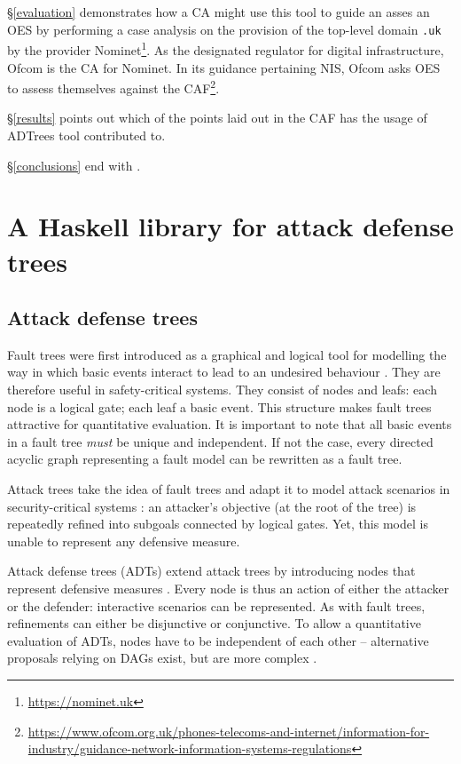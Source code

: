 \documentclass{scrreprt}
\begin{document}
\S\ref{evaluation} demonstrates how a CA might use this tool to guide an asses
an OES by performing a case analysis on the provision of the top-level domain
\texttt{.uk} by the provider Nominet\footnote{\url{https://nominet.uk}}. As the
designated regulator for digital infrastructure, Ofcom is the CA for Nominet. In
its guidance pertaining NIS, Ofcom asks OES to assess themselves against the
CAF\footnote{\url{https://www.ofcom.org.uk/phones-telecoms-and-internet/information-for-industry/guidance-network-information-systems-regulations}}.

\S\ref{results} points out which of the points laid out in the CAF has the usage
of ADTrees tool contributed to. \todo{}

\S\ref{conclusions} end with \todo{}.


\chapter{A Haskell library for attack defense trees}
\label{tool}

\section{Attack defense trees}

Fault trees were first introduced as a graphical and logical tool for modelling
the way in which basic events interact to lead to an undesired behaviour
\cite[IV.1]{Vesely1981}. They are therefore useful in safety-critical systems.
They consist of nodes and leafs: each node is a logical gate; each leaf a basic
event. This structure makes fault trees attractive for quantitative evaluation.
It is important to note that all basic events in a fault tree \textit{must} be
unique and independent. If not the case, every directed acyclic graph
representing a fault model can be rewritten as a fault tree.  

Attack trees take the idea of fault trees and adapt it to model attack scenarios
in security-critical systems \cite{Schneier1999} \cite{Brooke2003}
\cite{NaiFovino2009}: an attacker's objective
(at the root of the tree) is repeatedly refined into subgoals connected by
logical gates. Yet, this model is unable to represent any defensive measure.

Attack defense trees (ADTs) extend attack trees by introducing nodes that
represent defensive measures \cite{KordyFoundations}. Every node is thus an
action of either the attacker or the defender: interactive scenarios can be
represented.  As with fault trees, refinements can either be disjunctive or
conjunctive. To allow a quantitative evaluation of ADTs, nodes have to be
independent of each other -- alternative proposals relying on DAGs exist, but
are more complex \cite{KordyDAG}.
\end{document}
